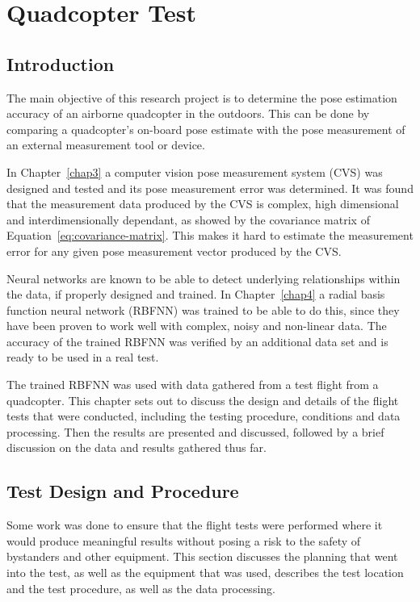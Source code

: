 \chapter{Quadcopter Test}
\label{chap5}

\section{Introduction}

The main objective of this research project is to determine the pose estimation accuracy of an airborne quadcopter in the outdoors. This can be done by comparing a quadcopter's on-board pose estimate with the pose measurement of an external measurement tool or device.  

In Chapter~\ref{chap3} a computer vision pose measurement system (CVS) was designed and tested and its pose measurement error was determined. It was found that the measurement data produced by the CVS is complex, high dimensional and interdimensionally dependant, as showed by the covariance matrix of Equation~\ref{eq:covariance-matrix}. This makes it hard to estimate the measurement error for any given pose measurement vector produced by the CVS.\@ 

Neural networks are known to be able to detect underlying relationships within the data, if properly designed and trained. In Chapter~\ref{chap4} a radial basis function neural network (RBFNN) was trained to be able to do this, since they have been proven to work well with complex, noisy and non-linear data. The accuracy of the trained RBFNN was verified by an additional data set and is ready to be used in a real test. 

The trained RBFNN was used with data gathered from a test flight from a quadcopter. This chapter sets out to discuss the design and details of the flight tests that were conducted, including the testing procedure, conditions and data processing. Then the results are presented and discussed, followed by a brief discussion on the data and results gathered thus far. 

\section{Test Design and Procedure}

Some work was done to ensure that the flight tests were performed where it would produce meaningful results without posing a risk to the safety of bystanders and other equipment. This section discusses the planning that went into the test, as well as the equipment that was used, describes the test location and the test procedure, as well as the data processing.  

